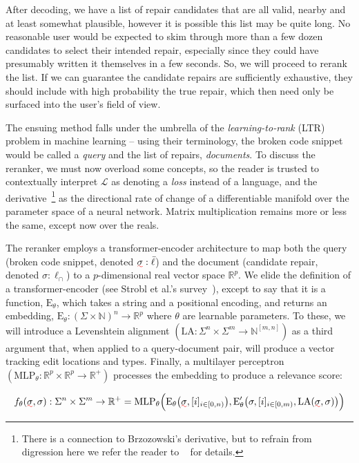 \documentclass[sigplan,review,acmsmall,nonacm,screen,anonymous]{acmart}\settopmatter{printfolios=false,printccs=false,printacmref=false}
\begin{document}
After decoding, we have a list of repair candidates that are all valid, nearby and at least somewhat plausible, however it is possible this list may be quite long. No reasonable user would be expected to skim through more than a few dozen candidates to select their intended repair, especially since they could have presumably written it themselves in a few seconds. So, we will proceed to rerank the list. If we can guarantee the candidate repairs are sufficiently exhaustive, they should include with high probability the true repair, which then need only be surfaced into the user's field of view.

The ensuing method falls under the umbrella of the \textit{learning-to-rank} (LTR) problem in machine learning -- using their terminology, the broken code snippet would be called a \textit{query} and the list of repairs, \textit{documents}. To discuss the reranker, we must now overload some concepts, so the reader is trusted to contextually interpret $\mathcal{L}$ as denoting a \textit{loss} instead of a language, and the derivative~\footnote{There is a connection to Brzozowski's derivative, but to refrain from digression here we refer the reader to ~\cite{elliott2019generalized} for details.} as the directional rate of change of a differentiable manifold over the parameter space of a neural network. Matrix multiplication remains more or less the same, except now over the reals.

The reranker employs a transformer-encoder architecture to map both the query (broken code snippet, denoted $\err\sigma: \bar\ell$) and the document (candidate repair, denoted $\sigma: \ell_\cap$) to a $p$-dimensional real vector space $\mathbb{R}^p$. We elide the definition of a transformer-encoder (see Strobl et al.'s survey~\cite{strobl2024formal}), except to say that it is a function, $\text{E}_\theta$, which takes a string and a positional encoding, and returns an embedding, $\text{E}_\theta: (\Sigma\times \mathbb{N})^n \rightarrow \mathbb{R}^p$ where $\theta$ are learnable parameters. To these, we will introduce a Levenshtein alignment $(\text{LA}: \Sigma^n \times \Sigma^m \rightarrow \mathbb{N}^{[m, n]})$ as a third argument that, when applied to a query-document pair, will produce a vector tracking edit locations and types. Finally, a multilayer perceptron $(\text{MLP}_\theta: \mathbb{R}^p \times \mathbb{R}^p \rightarrow \mathbb{R}^+)$ processes the embedding to produce a relevance score:


\[
f_\theta(\err\sigma, \sigma): \Sigma^n \times \Sigma^m \rightarrow \mathbb{R}^+ = \text{MLP}_{\theta}\Big(\text{E}_\theta\big(\err\sigma, [i]_{i\in [0, n)}\big), \text{E}_\theta'\big(\sigma, [i]_{i \in [0, m)}, \text{LA}(\err\sigma, \sigma)\big)\Big)
\]
\end{document}

